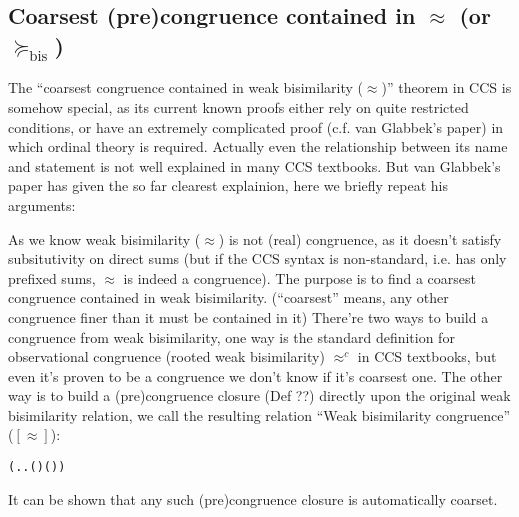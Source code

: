 
\subsection{Coarsest (pre)congruence contained in $\approx$ (or $\succeq_{\mathrm{bis}}$)}

The ``coarsest congruence contained in weak bisimilarity ($\approx$)''
theorem in CCS is somehow special, as its current known proofs either
rely on quite restricted conditions, or have an extremely complicated proof
(c.f. van Glabbek's paper) in
which ordinal theory is required.  Actually even the relationship
between its name and statement is not well explained in many CCS
textbooks. But van Glabbek's paper has given the so far clearest
explainion, here we briefly repeat his arguments:

As we know weak bisimilarity ($\approx$) is not (real) congruence, as
it doesn't satisfy subsitutivity on direct sums (but if the CCS syntax
is non-standard, i.e. has only prefixed sums, $\approx$ is indeed a
congruence). The purpose is to find a coarsest congruence contained in
weak bisimilarity. (``coarsest'' means, any other congruence finer than it must be contained in it)
There're two ways to build a congruence from weak bisimilarity, one
way is the standard definition for observational congruence (rooted
weak bisimilarity) $\approx^c$ in CCS textbooks, but even it's proven to be a
congruence we don't know if it's coarsest one.  The other way is to
build a (pre)congruence closure (Def ??) directly upon
the original weak bisimilarity relation, we call the resulting
relation ``Weak bisimilarity congruence'' ($[\approx]$):
\begin{alltt}
 \HOLSymConst{=}  
  \HOLSymConst{=} (\HOLTokenLambda{} . \HOLSymConst{\HOLTokenForall{}}.   \HOLSymConst{\HOLTokenImp{}}  ( ) ( ))
\end{alltt}
It can be shown that any such (pre)congruence closure is automatically coarset.

